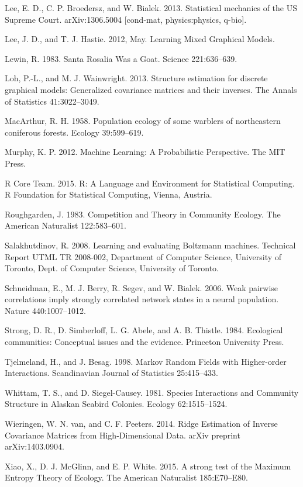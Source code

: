 \documentclass[12pt,]{article}
\begin{document}
\begin{spacing}{1.9}
\begin{flushleft}
Lee, E. D., C. P. Broedersz, and W. Bialek. 2013. Statistical mechanics
of the US Supreme Court. arXiv:1306.5004 {[}cond-mat, physics:physics,
q-bio{]}.

Lee, J. D., and T. J. Hastie. 2012, May. Learning Mixed Graphical
Models.

Lewin, R. 1983. Santa Rosalia Was a Goat. Science 221:636--639.

Loh, P.-L., and M. J. Wainwright. 2013. Structure estimation for
discrete graphical models: Generalized covariance matrices and their
inverses. The Annals of Statistics 41:3022--3049.

MacArthur, R. H. 1958. Population ecology of some warblers of
northeastern coniferous forests. Ecology 39:599--619.

Murphy, K. P. 2012. Machine Learning: A Probabilistic Perspective. The
MIT Press.

R Core Team. 2015. R: A Language and Environment for Statistical
Computing. R Foundation for Statistical Computing, Vienna, Austria.

Roughgarden, J. 1983. Competition and Theory in Community Ecology. The
American Naturalist 122:583--601.

Salakhutdinov, R. 2008. Learning and evaluating Boltzmann machines.
Technical Report UTML TR 2008-002, Department of Computer Science,
University of Toronto, Dept. of Computer Science, University of Toronto.

Schneidman, E., M. J. Berry, R. Segev, and W. Bialek. 2006. Weak
pairwise correlations imply strongly correlated network states in a
neural population. Nature 440:1007--1012.

Strong, D. R., D. Simberloff, L. G. Abele, and A. B. Thistle. 1984.
Ecological communities: Conceptual issues and the evidence. Princeton
University Press.

Tjelmeland, H., and J. Besag. 1998. Markov Random Fields with
Higher-order Interactions. Scandinavian Journal of Statistics
25:415--433.

Whittam, T. S., and D. Siegel-Causey. 1981. Species Interactions and
Community Structure in Alaskan Seabird Colonies. Ecology 62:1515--1524.

Wieringen, W. N. van, and C. F. Peeters. 2014. Ridge Estimation of
Inverse Covariance Matrices from High-Dimensional Data. arXiv preprint
arXiv:1403.0904.

Xiao, X., D. J. McGlinn, and E. P. White. 2015. A strong test of the
Maximum Entropy Theory of Ecology. The American Naturalist 185:E70--E80.


\end{flushleft}
\end{spacing}
\end{document}
